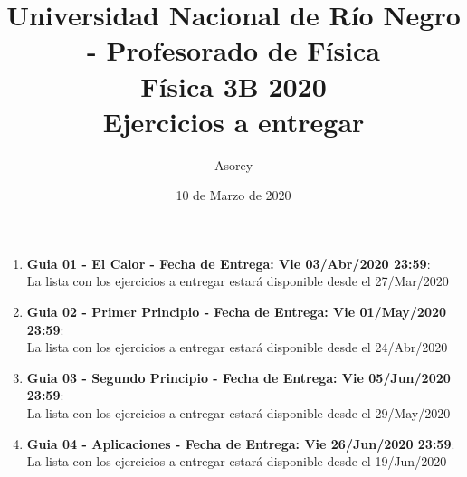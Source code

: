 \documentclass[a4paper,12pt]{article}
\begin{document}
\title{
{\normalsize{Universidad Nacional de Río Negro - Profesorado de Física}}\\
Física 3B 2020\\ Ejercicios a entregar}
\author{Asorey}
\date{10 de Marzo de 2020}
\maketitle

\begin{enumerate}
	\item {\bf{Guia 01 - El Calor - Fecha de Entrega: Vie 03/Abr/2020 23:59}}:\\
		La lista con los ejercicios a entregar estará disponible desde el 27/Mar/2020
	\item {\bf{Guia 02 - Primer Principio - Fecha de Entrega: Vie 01/May/2020 23:59}}:\\		
		La lista con los ejercicios a entregar estará disponible desde el 24/Abr/2020
	\item {\bf{Guia 03 - Segundo Principio - Fecha de Entrega: Vie 05/Jun/2020 23:59}}:\\		
		La lista con los ejercicios a entregar estará disponible desde el 29/May/2020
	\item {\bf{Guia 04 - Aplicaciones - Fecha de Entrega: Vie 26/Jun/2020 23:59}}:\\		
		La lista con los ejercicios a entregar estará disponible desde el 19/Jun/2020
\end{enumerate}
\end{document}
